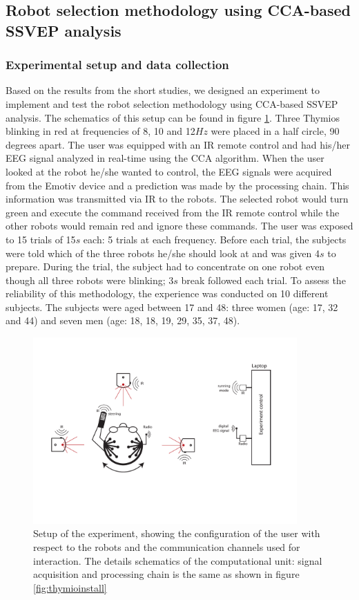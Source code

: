 \documentclass[smallextended]{svjour3}
\begin{document}
\subsection{Robot selection methodology using CCA-based SSVEP analysis}
\subsubsection{Experimental setup and data collection}
Based on the results from the short studies, we designed an experiment to implement and test the robot selection methodology using CCA-based SSVEP analysis. The schematics of this setup can be found in figure \ref{fig:experiment-set-up}. Three Thymios blinking in red at frequencies of 8, 10 and 12$Hz$ were placed in a half circle, 90 degrees apart. The user was equipped with an IR remote control and had his/her EEG signal analyzed in real-time using the CCA algorithm. When the user looked at the robot he/she wanted to control, the EEG signals were acquired from the Emotiv device and a prediction was made by the processing chain. This information was transmitted via IR to the robots. The selected robot would turn green and execute the command received from the IR remote control while the other robots would remain red and ignore these commands. The user was exposed to 15 trials of 15$s$ each: 5 trials at each frequency. Before each trial, the subjects were told which of the three robots he/she should look at and was given 4$s$ to prepare. During the trial, the subject had to concentrate on one robot even though all three robots were blinking; 3$s$ break followed each trial. To assess the reliability of this methodology, the experience was conducted on 10 different subjects. The subjects were aged between 17 and 48: three women (age: 17, 32 and 44) and seven men (age: 18, 18, 19, 29, 35, 37, 48). 

\begin{figure}
\center
\includegraphics[width=0.9\textwidth]{figures/schema-global2.pdf}
\caption{Setup of the experiment, showing the configuration of the user with respect to the robots and the communication channels used for interaction. The details schematics of the computational unit: signal acquisition and processing chain is the same as shown in figure \ref{fig:thymioinstall}} \label{fig:experiment-set-up}
\end{figure}
\end{document}
